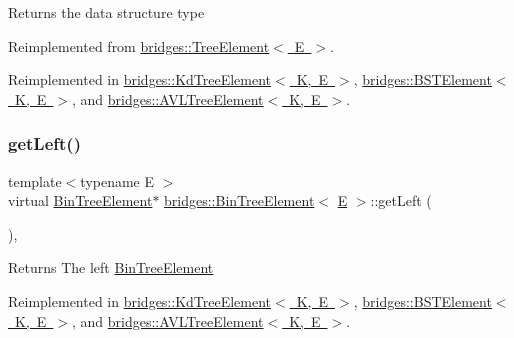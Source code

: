 \begin{DoxyReturn}{Returns}
the data structure type 
\end{DoxyReturn}


Reimplemented from \mbox{\hyperlink{classbridges_1_1_tree_element_a6b264d7391442a742edf96bdd5ee5442}{bridges\+::\+Tree\+Element$<$ E $>$}}.



Reimplemented in \mbox{\hyperlink{classbridges_1_1_kd_tree_element_acdd8f989986b7dd42cfacec73cf52dcb}{bridges\+::\+Kd\+Tree\+Element$<$ K, E $>$}}, \mbox{\hyperlink{classbridges_1_1_b_s_t_element_af3843873c508c24f90b6e73a6f490bf8}{bridges\+::\+B\+S\+T\+Element$<$ K, E $>$}}, and \mbox{\hyperlink{classbridges_1_1_a_v_l_tree_element_a24c005f8e07a7a2682225cead3b7e364}{bridges\+::\+A\+V\+L\+Tree\+Element$<$ K, E $>$}}.

\mbox{\label{classbridges_1_1_bin_tree_element_a8367ce9c4eea814637edc2c56efbde25}} 
\subsubsection{\texorpdfstring{getLeft()}{getLeft()}\hspace{0.1cm}{\footnotesize\ttfamily [1/2]}}
{\footnotesize\ttfamily template$<$typename E $>$ \\
virtual \mbox{\hyperlink{classbridges_1_1_bin_tree_element}{Bin\+Tree\+Element}}$\ast$ \mbox{\hyperlink{classbridges_1_1_bin_tree_element}{bridges\+::\+Bin\+Tree\+Element}}$<$ \mbox{\hyperlink{namespacebridges_acfb0a4f7877d8f63de3e6862004c50eda3a3ea00cfc35332cedf6e5e9a32e94da}{E}} $>$\+::get\+Left (\begin{DoxyParamCaption}{ }\end{DoxyParamCaption})\hspace{0.3cm}{\ttfamily [inline]}, {\ttfamily [virtual]}}

\begin{DoxyReturn}{Returns}
The left \mbox{\hyperlink{classbridges_1_1_bin_tree_element}{Bin\+Tree\+Element}} 
\end{DoxyReturn}


Reimplemented in \mbox{\hyperlink{classbridges_1_1_kd_tree_element_ad7db63a4f82f5252c7e0809ac6486cb4}{bridges\+::\+Kd\+Tree\+Element$<$ K, E $>$}}, \mbox{\hyperlink{classbridges_1_1_b_s_t_element_a4d8987373c75b51fca94e3c0b78b87a6}{bridges\+::\+B\+S\+T\+Element$<$ K, E $>$}}, and \mbox{\hyperlink{classbridges_1_1_a_v_l_tree_element_a7b5d05660da127f5f6164120d9846d90}{bridges\+::\+A\+V\+L\+Tree\+Element$<$ K, E $>$}}.

